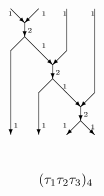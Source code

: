 \documentclass{amsart}
\theoremstyle{plain}
\theoremstyle{definition}
\theoremstyle{remark}
\numberwithin{equation}{section}
\begin{document}
\begin{figure}[ht]
\[
\xymatrix{

\setlength{\unitlength}{1pt}
\begin{picture}(60,145)(-30,-35)

\put(-30,90){\vector(1,-1){10}}

\put(-10,90){\vector(-1,-1){10}}

\put(-20,80){\vector(0,-1){10}}

\put(-20,70){\line(-1,-1){10}}

\put(-30,60){\vector(0,-1){60}}

\put(-20,70){\vector(1,-1){20}}

\put(10,60){\vector(-1,-1){10}}

\put(10,90){\line(0,-1){30}}

\put(0,50){\vector(0,-1){10}}

\put(0,40){\line(-1,-1){10}}

\put(-10,30){\vector(0,-1){30}}

\put(0,40){\vector(1,-1){20}}

\put(30,90){\line(0,-1){60}}

\put(30,30){\vector(-1,-1){10}}

\put(20,20){\vector(0,-1){10}}

\put(20,10){\vector(-1,-1){10}}

\put(20,10){\vector(1,-1){10}}

\put(-32,85){\tiny{$1$}}

\put(-28,5){\tiny{$1$}}

\put(-8,85){\tiny{$1$}}

\put(-8,62){\tiny{$1$}}

\put(-8,5){\tiny{$1$}}

\put(7,5){\tiny{$1$}}

\put(7,33){\tiny{$1$}}

\put(7,85){\tiny{$1$}}

\put(27,4){\tiny{$1$}}

\put(27,85){\tiny{$1$}}

\put(-18,73){\tiny{$2$}}

\put(2,43){\tiny{$2$}}

\put(22,13){\tiny{$2$}}

\put(-10,-35){$(\tau_1\tau_2\tau_3)_4$}

\end{picture}
 && 
\setlength{\unitlength}{1pt}
\begin{picture}(140,145)(-30,-35)


\end{picture}}\]
\end{figure}
\end{document}
